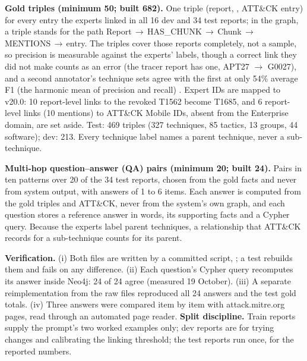 \documentclass[10pt]{article}
\begin{document}
\textbf{Gold triples (minimum 50; built 682).} One triple (report, , ATT\&CK entry) for every entry the experts linked in all 16 dev and 34 test reports; in the graph, a triple stands for the path Report\,$\rightarrow$\,HAS\_CHUNK\,$\rightarrow$\,Chunk\,$\rightarrow$\,MENTIONS\,$\rightarrow$\,entry. The triples cover those reports completely, not a sample, so precision is measurable against the experts' labels, though a correct link they did not make counts as an error (the tracer report has one, APT27 $\rightarrow$ G0027), and a second annotator's technique sets agree with the first at only 54\% average F1 (the harmonic mean of precision and recall) \cite{1}. Expert IDs are mapped to v20.0: 10 report-level links to the revoked T1562 become T1685, and 6 report-level links (10 mentions) to ATT\&CK Mobile IDs, absent from the Enterprise domain, are set aside. Test: 469 triples (327 techniques, 85 tactics, 13 groups, 44 software); dev: 213. Every technique label names a parent technique, never a sub-technique.

\textbf{Multi-hop question--answer (QA) pairs (minimum 20; built 24).} Pairs in ten patterns over 20 of the 34 test reports, chosen from the gold facts and never from system output, with answers of 1 to 6 items. Each answer is computed from the gold triples and ATT\&CK, never from the system's own graph, and each question stores a reference answer in words, its supporting facts and a Cypher query. Because the experts label parent techniques, a relationship that ATT\&CK records for a sub-technique counts for its parent.

\textbf{Verification.} (i) Both files are written by a committed script, ; a test rebuilds them and fails on any difference. (ii) Each question's Cypher query recomputes its answer inside Neo4j: 24 of 24 agree (measured 19 October). (iii) A separate reimplementation from the raw files reproduced all 24 answers and the test gold totals. (iv) Three answers were compared item by item with attack.mitre.org pages, read through an automated page reader.
\textbf{Split discipline.} Train reports supply the prompt's two worked examples only; dev reports are for trying changes and calibrating the linking threshold; the test reports run once, for the reported numbers.
\end{document}
